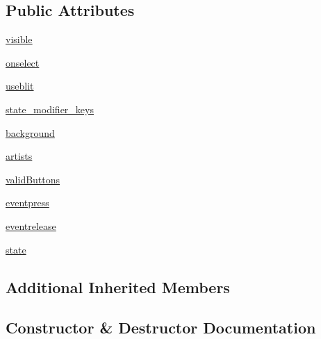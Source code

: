 \subsection*{Public Attributes}
\begin{DoxyCompactItemize}
\item 
\hyperlink{classmatplotlib_1_1widgets_1_1__SelectorWidget_a1549be0991202a41db2269fd07ad0a90}{visible}
\item 
\hyperlink{classmatplotlib_1_1widgets_1_1__SelectorWidget_ad893af1ad010d595c7cce1106b48d854}{onselect}
\item 
\hyperlink{classmatplotlib_1_1widgets_1_1__SelectorWidget_a6d178ef2dd7ec61c11b18302de3f43bf}{useblit}
\item 
\hyperlink{classmatplotlib_1_1widgets_1_1__SelectorWidget_ada64a11df65865f0f79e47f7c731b81c}{state\+\_\+modifier\+\_\+keys}
\item 
\hyperlink{classmatplotlib_1_1widgets_1_1__SelectorWidget_a2e0d01082e5ed1a6260fdb70ec7e1d91}{background}
\item 
\hyperlink{classmatplotlib_1_1widgets_1_1__SelectorWidget_a1a92875a69279983f33bfe8dd75e6463}{artists}
\item 
\hyperlink{classmatplotlib_1_1widgets_1_1__SelectorWidget_a156ec3d55b68c58d7fb5ca313ee8b01c}{valid\+Buttons}
\item 
\hyperlink{classmatplotlib_1_1widgets_1_1__SelectorWidget_a4017c4bfac5806b3fa91dd95cfe2296c}{eventpress}
\item 
\hyperlink{classmatplotlib_1_1widgets_1_1__SelectorWidget_a1d7548a1df0a461bd9734c858f708bef}{eventrelease}
\item 
\hyperlink{classmatplotlib_1_1widgets_1_1__SelectorWidget_a5fa689fe9863b583233406da95ff1f44}{state}
\end{DoxyCompactItemize}
\subsection*{Additional Inherited Members}


\subsection{Constructor \& Destructor Documentation}
\mbox{\label{classmatplotlib_1_1widgets_1_1__SelectorWidget_a8f1d2504bdd325ccf589a825c3487276}} 
